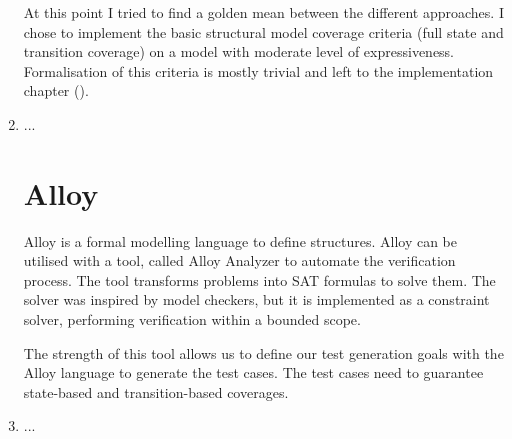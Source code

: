 \begin{enumerate}
At this point I tried to find a golden mean between the different approaches. I chose to implement the basic structural model coverage criteria (full state and transition coverage) on a model with moderate level of expressiveness. Formalisation of this criteria is mostly trivial and left to the implementation chapter (\cite{cha:implementation}).
\item ... %

\section{Alloy}
\label{sec:alloy}

Alloy is a formal modelling language to define structures. Alloy can be utilised with a tool, called Alloy Analyzer to automate the verification process. The tool transforms problems into SAT formulas to solve them. The solver was inspired by model checkers, but it is implemented as a constraint solver, performing verification within a bounded scope.

The strength of this tool allows us to define our test generation goals with the Alloy language to generate the test cases. The test cases need to guarantee state-based and transition-based coverages.


\item ... %

\end{enumerate}

